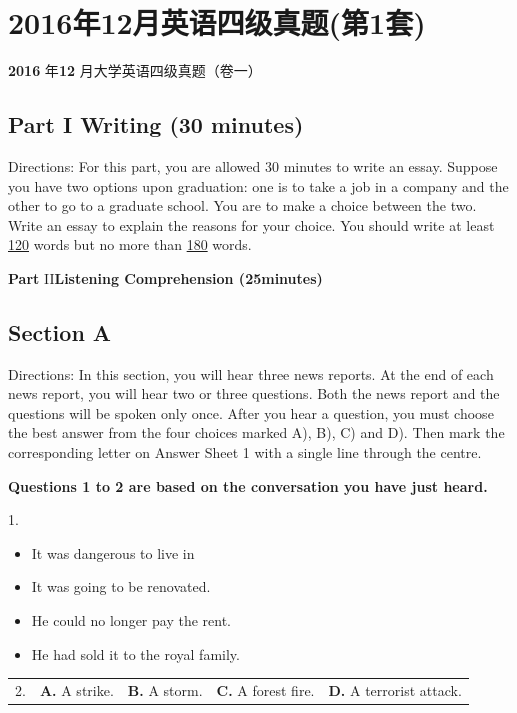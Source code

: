 \documentclass[UTF8,11pt]{ctexart}
\begin{document}
\section*{2016年12月英语四级真题(第1套)}
\textbf{2016} 年\textbf{12} 月大学英语四级真题（卷一）


\subsection*{\textbf{Part I Writing (30 minutes)}}


Directions: For this part, you are allowed 30 minutes to write an essay. Suppose you have two options upon graduation: one is to take a job in a company and the other to go to a graduate school. You are to make a choice between the two. Write an essay to explain the reasons for your choice. You should write at least \uline{120} words but no more than \uline{180} words.


\textbf{Part} II\textbf{Listening Comprehension (25minutes)}


\subsection*{\textbf{Section A}}


Directions: In this section, you will hear three news reports. At the end of each news report, you will hear two or three questions. Both the news report and the questions will be spoken only once. After you hear a question, you must choose the best answer from the four choices marked A), B), C) and D). Then mark the corresponding letter on Answer Sheet 1 with a single line through the centre.


\textbf{Questions 1 to 2 are based on the conversation you have just heard.}


1.


\begin{itemize}[leftmargin=2em,itemsep=.2em,topsep=.4em]\item[A.] It was dangerous to live in
\item[B.] It was going to be renovated.
\item[C.] He could no longer pay the rent.
\item[D.] He had sold it to the royal family.
\end{itemize}

\noindent\begin{tabularx}{\linewidth}{@{}lXXXX@{}}2. & \textbf{A.} A strike. & \textbf{B.} A storm. & \textbf{C.} A forest fire. & \textbf{D.} A terrorist attack.\\\end{tabularx}\par
\end{document}
